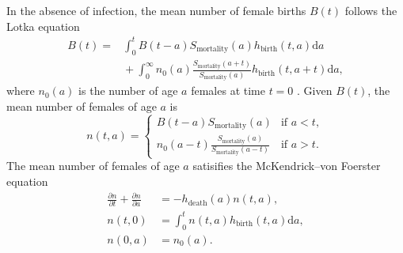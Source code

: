 \documentclass{article}
\newcommand{\md}{\mathrm{d}}
\begin{document}
In the absence of infection, the mean number of female births $B(t)$
follows the Lotka equation
\begin{equation}
  \label{lotka}
  \begin{split}
    B(t) =&
    \int_0^t B(t - a) S_{\text{mortality}}(a) h_{\text{birth}}(t, a) \md a
    \\
    & {} +
    \int_0^{\infty} n_0(a) \frac{S_{\text{mortality}}(a +
      t)}{S_{\text{mortality}}(a)} h_{\text{birth}}(t, a + t) \md a,
  \end{split}
\end{equation}
where $n_0(a)$ is the number of age $a$ females at time $t = 0$
\citetext{\citealp[Chapter VI, Section 29 on
  pp.~159--161]{harris_1963};
  \citealp[Chapter 20 on pp.~353--364]{kot_01}}.
Given $B(t)$, the mean number of females of age $a$ is
\begin{equation}
  n(t, a) =
  \begin{cases}
    B(t - a) S_{\text{mortality}}(a)
    & \text{if $a < t$},
    \\
    n_0(a - t)
    \frac{S_{\text{mortality}}(a)}{S_{\text{mortality}}(a - t)}
    & \text{if $a > t$}.
  \end{cases}
\end{equation}
The mean number of females of age $a$ satisifies the McKendrick--von
Foerster equation
\begin{equation}
  \begin{split}
    \frac{\partial n}{\partial t} + \frac{\partial n}{\partial a}
    &= - h_{\text{death}}(a) n(t, a),
    \\
    n(t, 0) &= \int_0^t n(t, a) h_{\text{birth}}(t, a) \md a,
    \\
    n(0, a) &= n_0(a).
  \end{split}
\end{equation}
\end{document}
